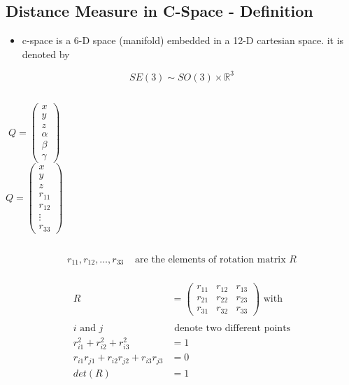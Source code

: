 \documentclass[%
  professionalfonts,%
  xcolor={%
    usenames,%
    dvipsnames,%
    svgnames,%
    table,%
    hyperref%
  }%
]{beamer}
\begin{document}
\subsection{Distance Measure in C-Space - Definition}
\begin{frame}
	
\begin{itemize}
\item c-space is a 6-D space (manifold) embedded in a 12-D cartesian space. it is denoted by
\end{itemize}

\begin{equation*}
	SE(3) \sim SO(3) \times \mathbb{R}^{3} \label{eq:seso}
\end{equation*}

\begin{columns}
\begin{equation*}
Q = \left( \begin{array}{c} x \\ y \\ z \\ \alpha \\ \beta \\ \gamma \end{array} \right)
\end{equation*}
\begin{equation*}
Q = \left( \begin{array}{c} x \\ y \\ z \\ r_{11} \\ r_{12} \\ \vdots \\ r_{33} \end{array} \right)
\end{equation*}
\end{columns}

\begin{align*}
r_{11},r_{12},\dotsc,r_{33} & \text{ are the elements of rotation matrix } R \\
\end{align*}

\end{frame}

\begin{frame}
\begin{align*}
R & = \begin{pmatrix}
r_{11} & r_{12} & r_{13} \\
r_{21} & r_{22} & r_{23} \\
r_{31} & r_{32} & r_{33}
\end{pmatrix} \text{ with} \\ \\
i \text{ and } j & \text{ denote two different points} \\
r_{i1}^2+r_{i2}^2+r_{i3}^2 & = 1 \\
r_{i1}r_{j1} + r_{i2}r_{j2} + r_{i3}r_{j3} & = 0 \\
det(R) & = 1
\end{align*}
\end{frame}
\end{document}
